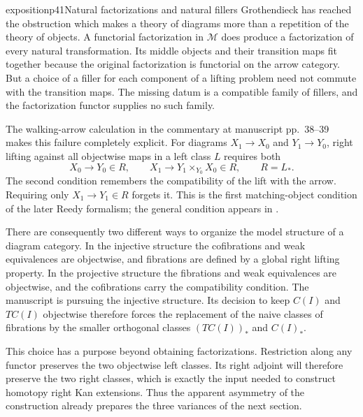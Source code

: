 \begin{dcomment}{exposition}{p41}{Natural factorizations and natural fillers}
Grothendieck has reached the obstruction which makes a theory of diagrams more than a repetition of the theory of objects. A functorial factorization in $\mathcal M$ does produce a factorization of every natural transformation. Its middle objects and their transition maps fit together because the original factorization is functorial on the arrow category. But a choice of a filler for each component of a lifting problem need not commute with the transition maps. The missing datum is a compatible family of fillers, and the factorization functor supplies no such family.

The walking-arrow calculation in the commentary at manuscript pp.~38--39 makes this failure completely explicit. For diagrams $X_1\to X_0$ and $Y_1\to Y_0$, right lifting against all objectwise maps in a left class $L$ requires both
\[
 X_0\longrightarrow Y_0\in R,
 \qquad X_1\longrightarrow Y_1\mathbin{\times}_{Y_0}X_0\in R,
 \qquad R=L_*.
\]
The second condition remembers the compatibility of the lift with the arrow. Requiring only $X_1\to Y_1\in R$ forgets it. This is the first matching-object condition of the later Reedy formalism; the general condition appears in \citet[Definition~5.2.2 and Theorem~5.2.5]{Hovey1999}.

There are consequently two different ways to organize the model structure of a diagram category. In the injective structure the cofibrations and weak equivalences are objectwise, and fibrations are defined by a global right lifting property. In the projective structure the fibrations and weak equivalences are objectwise, and the cofibrations carry the compatibility condition. The manuscript is pursuing the injective structure. Its decision to keep $C(I)$ and $TC(I)$ objectwise therefore forces the replacement of the naive classes of fibrations by the smaller orthogonal classes $(TC(I))_*$ and $C(I)_*$.

This choice has a purpose beyond obtaining factorizations. Restriction along any functor preserves the two objectwise left classes. Its right adjoint will therefore preserve the two right classes, which is exactly the input needed to construct homotopy right Kan extensions. Thus the apparent asymmetry of the construction already prepares the three variances of the next section.
\end{dcomment}

